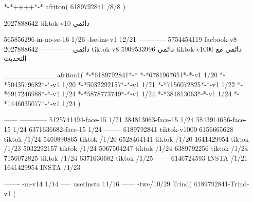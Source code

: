 *-*++++*-*
afriton(
6189792841 /8/8
)

2027888642 tiktok-v10
دائمي

565856296-in-no-se-16 1/26
-lse-ins-v1 12/21
------------
5754454119 facbook-v8
دائمي
--------------
2027888642 tiktok-v8
دائمي
5909533996 tiktok-v1000
دائمي مع التحديث

__________
afriton1(
*-*6189792841*-*
*-*6781967651*-*-v1 1/20
*-*5043579682*-*-v1 1/20
*-*5032292157*-*-v1 1/21
*-*7156072825*-*-v1 1/22
*-*6917246988*-*-v1 1/24
*-*5878773749*-*-v1 1/24
*-*384813063*-*-v1 1/24
*-*1446035077*-*-v1 1/24
)

------
------------
5125741494-face-15 1/21
384813063-face-15 1/24
5843914656-face-15 1/24
6371636682-face-15 1/24
--------
6189792841 tiktok-v1000
6156665628 tiktok /1/24
5460890865 tiktok /1/20
6528464141 tiktok /1/20
1641429954 tiktok /1/23
5032292157 tiktok /1/24
5067504247 tiktok /1/24
6389792256 tiktok /1/24
7156072825 tiktok /1/24
6371636682 tiktok /1/25
------
6146724593 INSTA /1/21
1641429954 INSTA /1/23

-------
-m-v14 1/14
-----
userinsta 11/16
------
-twe/10/29
Trind(
6189792841-Trind-v1 
)
